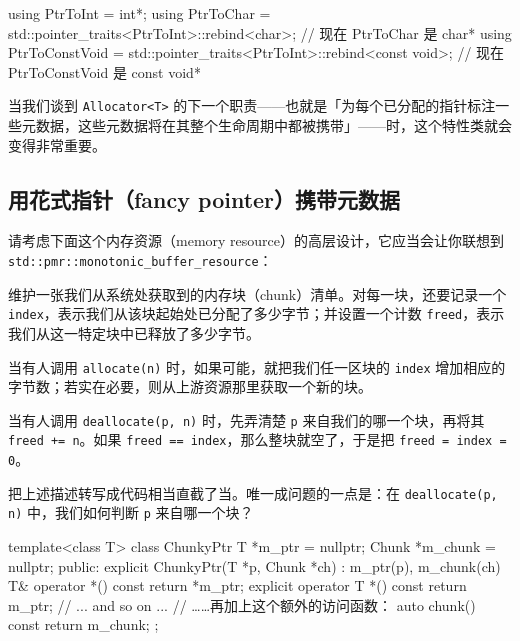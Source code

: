 \begin{codebox}[cpp]
     using PtrToInt = int*;
     using PtrToChar =
       std::pointer_traits<PtrToInt>::rebind<char>;
     // 现在 PtrToChar 是 char*
     using PtrToConstVoid =
       std::pointer_traits<PtrToInt>::rebind<const void>;
     // 现在 PtrToConstVoid 是 const void*
\end{codebox}

当我们谈到 \texttt{Allocator<\allowbreak{}T>\allowbreak{}} 的下一个职责——也就是「为每个已分配的指针标注一些元数据，这些元数据将在其整个生命周期中都被携带」——时，这个特性类就会变得非常重要。

\subsection{用花式指针（fancy pointer）携带元数据}

请考虑下面这个内存资源（memory resource）的高层设计，它应当会让你联想到 \texttt{std::\allowbreak{}pmr::\allowbreak{}monotonic\_\allowbreak{}buffer\_\allowbreak{}resource}：

维护一张我们从系统处获取到的内存块（chunk）清单。对每一块，还要记录一个 \texttt{index}，表示我们从该块起始处已分配了多少字节；并设置一个计数 \texttt{freed}，表示我们从这一特定块中已释放了多少字节。

当有人调用 \texttt{allocate(\allowbreak{}n)\allowbreak{}} 时，如果可能，就把我们任一区块的 \texttt{index} 增加相应的字节数；若实在必要，则从上游资源那里获取一个新的块。

当有人调用 \texttt{deallocate(\allowbreak{}p,\allowbreak{} n)\allowbreak{}} 时，先弄清楚 \texttt{p} 来自我们的哪一个块，再将其 \texttt{freed += n}。如果 \texttt{freed == index}，那么整块就空了，于是把 \texttt{freed = index = 0}。

把上述描述转写成代码相当直截了当。唯一成问题的一点是：在 \texttt{deallocate(\allowbreak{}p,\allowbreak{} n)\allowbreak{}} 中，我们如何判断 \texttt{p} 来自哪一个块？

\begin{codebox}[cpp]
     template<class T>
     class ChunkyPtr {
       T *m_ptr = nullptr;
       Chunk *m_chunk = nullptr;
     public:
       explicit ChunkyPtr(T *p, Chunk *ch) :
       m_ptr(p), m_chunk(ch) {}
       T& operator *() const {
         return *m_ptr;
       }
       explicit operator T *() const {
         return m_ptr;
       }
       // ... and so on ...
       // ……再加上这个额外的访问函数：
       auto chunk() const {
         return m_chunk;
       }
     };
\end{codebox}

